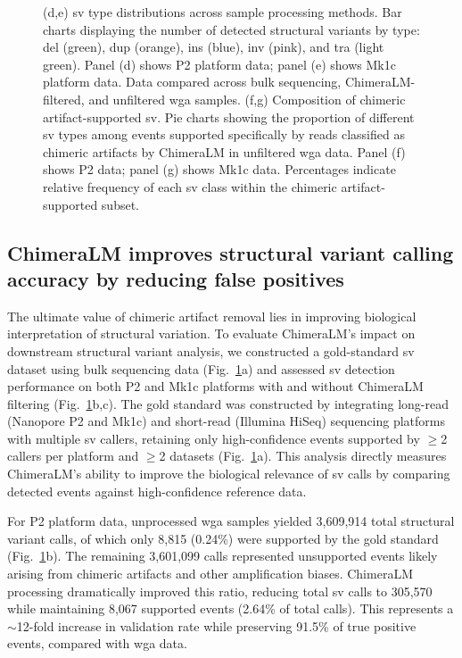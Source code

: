 \documentclass[pdflatex,sn-nature]{sn-jnl}%
\theoremstyle{thmstyleone}%
\theoremstyle{thmstyletwo}%
\theoremstyle{thmstylethree}%
\begin{document}
\begin{figure}[!ht]
{		(d,e) \gls{sv} type distributions across sample processing methods. Bar charts displaying the number of detected structural variants by type: \gls{del} (green), \gls{dup} (orange), \gls{ins} (blue), \gls{inv} (pink), and \gls{tra} (light green). Panel (d) shows P2 platform data; panel (e) shows Mk1c platform data. Data compared across bulk sequencing, ChimeraLM-filtered, and unfiltered \gls{wga} samples.
		(f,g) Composition of chimeric artifact-supported \gls{sv}. Pie charts showing the proportion of different \gls{sv} types among events supported specifically by reads classified as chimeric artifacts by ChimeraLM in unfiltered \gls{wga} data. Panel (f) shows P2 data; panel (g) shows Mk1c data. Percentages indicate relative frequency of each \gls{sv} class within the chimeric artifact-supported subset.}\label{fig:figure3}
\end{figure}

\subsection*{ChimeraLM improves structural variant calling accuracy by reducing false positives}

The ultimate value of chimeric artifact removal lies in improving biological interpretation of structural variation.
To evaluate ChimeraLM's impact on downstream structural variant analysis, we constructed a gold-standard \gls{sv} dataset using bulk sequencing data (Fig.~\ref{fig:figure3}a) and assessed \gls{sv} detection performance on both P2 and Mk1c platforms with and without ChimeraLM filtering (Fig.~\ref{fig:figure3}b,c).
The gold standard was constructed by integrating long-read (Nanopore P2 and Mk1c) and short-read (Illumina HiSeq) sequencing platforms with multiple \gls{sv} callers, retaining only high-confidence events supported by $\geq$2 callers per platform and $\geq$2 datasets (Fig.~\ref{fig:figure3}a).
This analysis directly measures ChimeraLM's ability to improve the biological relevance of \gls{sv} calls by comparing detected events against high-confidence reference data.

For P2 platform data, unprocessed \gls{wga} samples yielded 3,609,914 total structural variant calls, of which only 8,815 (0.24\%) were supported by the gold standard (Fig.~\ref{fig:figure3}b).
The remaining 3,601,099 calls represented unsupported events likely arising from chimeric artifacts and other amplification biases.
ChimeraLM processing dramatically improved this ratio, reducing total \gls{sv} calls to 305,570 while maintaining 8,067 supported events (2.64\% of total calls).
This represents a $\sim$12-fold increase in validation rate while preserving 91.5\% of true positive events, compared with \gls{wga} data.
\end{document}
